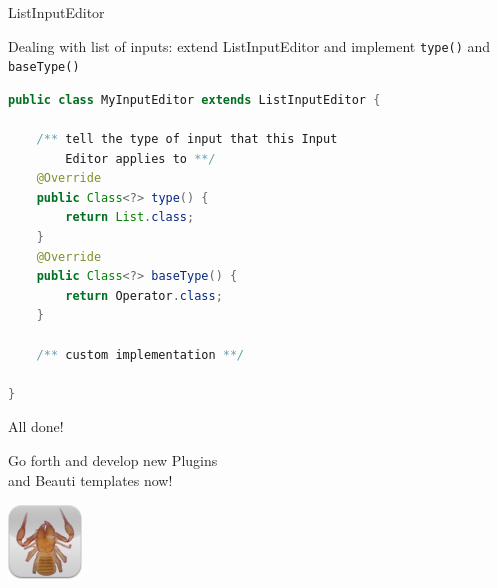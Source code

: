 \documentclass{beamer}
\theoremstyle{definition}
\begin{document}
\begin{frame}[containsverbatim]{ListInputEditor}

Dealing with list of inputs: extend ListInputEditor
and implement {\tt type()} and {\tt baseType()}

\begin{lstlisting}[language=java]
public class MyInputEditor extends ListInputEditor {

    /** tell the type of input that this Input 
        Editor applies to **/
	@Override
	public Class<?> type() {
		return List.class;
	}
	@Override
	public Class<?> baseType() {
		return Operator.class;
	}

    /** custom implementation **/

} 
\end{lstlisting}

\end{frame}


\begin{frame}[containsverbatim]{All done!}

Go forth and develop new Plugins \\and Beauti templates now!\vskip1cm

\begin{center}
\includegraphics{../../src/beast/app/draw/icons/beast.png}
\end{center}
\end{frame}

\fi
\end{document}
